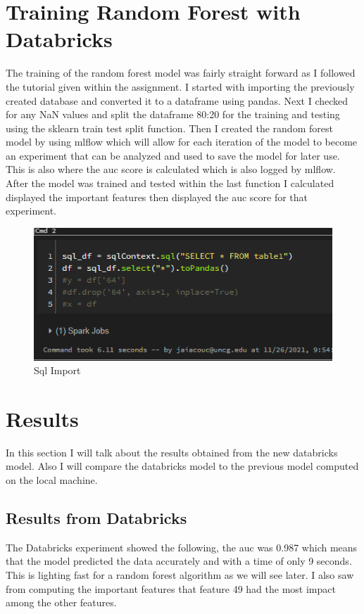 \documentclass[conference]{IEEEtran}
\begin{document}
\section{Training Random Forest with Databricks}
The training of the random forest model was fairly straight forward as I followed the tutorial given within the assignment. I started with importing the previously created database and converted it to a dataframe using pandas. Next I checked for any NaN values and split the dataframe 80:20 for the training and testing using the sklearn train test split function. Then I created the random forest model by using mlflow which will allow for each iteration of the model to become an experiment that can be analyzed and used to save the model for later use. This is also where the auc score is calculated which is also logged by mlflow. After the model was trained and tested within the last function I calculated displayed the important features then displayed the auc score for that experiment.

\begin{figure}[h]
  \centering
  \includegraphics[width=\linewidth]{sql_import.png}
  \caption{Sql Import}
\end{figure}

\section{Results}
In this section I will talk about the results obtained from the new databricks model. Also I will compare the databricks model to the previous model computed on the local machine.

\subsection{Results from Databricks}
The Databricks experiment showed the following, the auc was 0.987 which means that the model predicted the data accurately and with a time of only 9 seconds. This is lighting fast for a random forest algorithm as we will see later. I also saw from computing the important features that feature 49 had the most impact among the other features.
\end{document}
